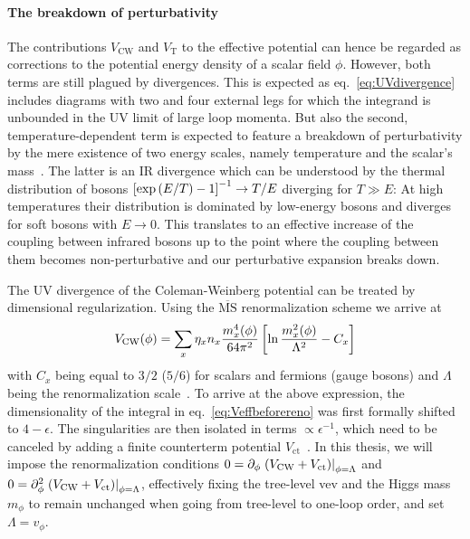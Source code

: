 \paragraph{The breakdown of perturbativity} The contributions $V_\text{CW}$ and $V_\text{T}$ to the effective potential can hence be regarded as corrections to the potential energy density of a scalar field $\phi$. However, both terms are still plagued by divergences. This is expected as eq.~\eqref{eq:UVdivergence} includes diagrams with two and four external legs for which the integrand is unbounded in the \ac{UV} limit of large loop momenta. But also the second, temperature-dependent term is expected to feature a breakdown of perturbativity by the mere existence of two energy scales, namely  temperature and the scalar's mass~\cite{Curtin:2016urg}. The latter is an \ac{IR} divergence which can be understood by the thermal distribution of bosons $\left[ \exp\left( E/T \right)-1 \right]^{-1} \rightarrow T/E$ diverging for $T \gg E$: At high temperatures their distribution is dominated by low-energy bosons and diverges for soft bosons with $E \rightarrow 0$. This translates to an effective increase of the coupling between infrared bosons up to the point where the coupling between them becomes non-perturbative and our perturbative expansion breaks down.

The \ac{UV} divergence of the Coleman-Weinberg potential can be treated by dimensional regularization. Using the $\overline{\text{MS}}$ renormalization scheme we arrive at~\cite{Basler:2018cwe,Athron:2023xlk, Coleman:1973jx}
\begin{align}
	V_\text{CW}(\phi) = \sum_x \eta_x n_x \frac{m_x^4(\phi)}{64 \pi^2} \left[ \ln \frac{m_x^2(\phi)}{\Lambda^2}- C_x \right]
\end{align}
with $C_x$ being equal to $3/2$ ($5/6$) for scalars and fermions (gauge bosons) and $\Lambda$ being the renormalization scale~\cite{Basler:2018cwe,Athron:2023xlk, Quiros:1999jp}. To arrive at the above expression, the dimensionality of the integral in eq.~\eqref{eq:Veffbeforereno} was first formally shifted to $4 - \epsilon$. The singularities are then isolated in terms $\propto \epsilon^{-1}$, which need to be canceled by adding a finite counterterm potential $V_\text{ct}$~\cite{Quiros:1999jp}. In this thesis, we will impose the renormalization conditions $0 = \partial_\phi \left.\left( V_\text{CW} + V_\text{ct} \right)\right|_{\phi = \Lambda}$ and $0 = \partial_\phi^2 \left.\left( V_\text{CW} + V_\text{ct} \right)\right|_{\phi = \Lambda}$, effectively fixing the tree-level \ac{vev} and the Higgs mass $m_\phi$ to remain unchanged when going from tree-level to one-loop order, and set $\Lambda = v_\phi$.

